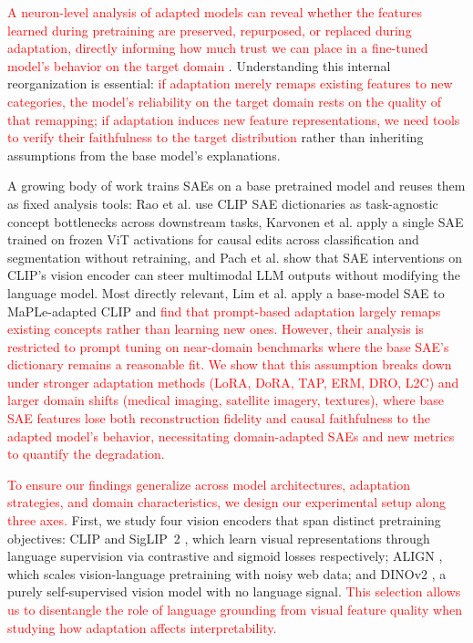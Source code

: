 \textcolor{red}{A neuron-level analysis of adapted models can reveal whether the features learned during pretraining are preserved, repurposed, or replaced during adaptation, directly informing how much trust we can place in a fine-tuned model's behavior on the target domain} \citep{durrani2020analyzing, csiszarik2021similarity}. Understanding this internal reorganization is essential: \textcolor{red}{if adaptation merely remaps existing features to new categories, the model's reliability on the target domain rests on the quality of that remapping; if adaptation induces new feature representations, we need tools to verify their faithfulness to the target distribution} rather than inheriting assumptions from the base model's explanations.

A growing body of work trains SAEs on a base pretrained model and reuses them as fixed analysis tools: Rao et al. \citep{rao2024discover} use CLIP SAE dictionaries as task-agnostic concept bottlenecks across downstream tasks, Karvonen et al. \citep{karvonen2025saevision} apply a single SAE trained on frozen ViT activations for causal edits across classification and segmentation without retraining, and Pach et al. \citep{pach2025monosemantic} show that SAE interventions on CLIP's vision encoder can steer multimodal LLM outputs without modifying the language model. Most directly relevant, Lim et al. \citep{lim2024patchsae} apply a base-model SAE to MaPLe-adapted CLIP and \textcolor{red}{find that prompt-based adaptation largely remaps existing concepts rather than learning new ones. However, their analysis is restricted to prompt tuning on near-domain benchmarks where the base SAE's dictionary remains a reasonable fit.} \textcolor{red}{We show that this assumption breaks down under stronger adaptation methods (LoRA, DoRA, TAP, ERM, DRO, L2C) and larger domain shifts (medical imaging, satellite imagery, textures), where base SAE features lose both reconstruction fidelity and causal faithfulness to the adapted model's behavior, necessitating domain-adapted SAEs and new metrics to quantify the degradation.}

\textcolor{red}{To ensure our findings generalize across model architectures, adaptation strategies, and domain characteristics, we design our experimental setup along three axes.} First, we study four vision encoders that span distinct pretraining objectives: CLIP \citep{radford2021learning} and SigLIP~2 \citep{tschannen2025siglip2}, which learn visual representations through language supervision via contrastive and sigmoid losses respectively; ALIGN \citep{jia2021scaling}, which scales vision-language pretraining with noisy web data; and DINOv2 \citep{oquab2024dinov2}, a purely self-supervised vision model with no language signal. \textcolor{red}{This selection allows us to disentangle the role of language grounding from visual feature quality when studying how adaptation affects interpretability.}

